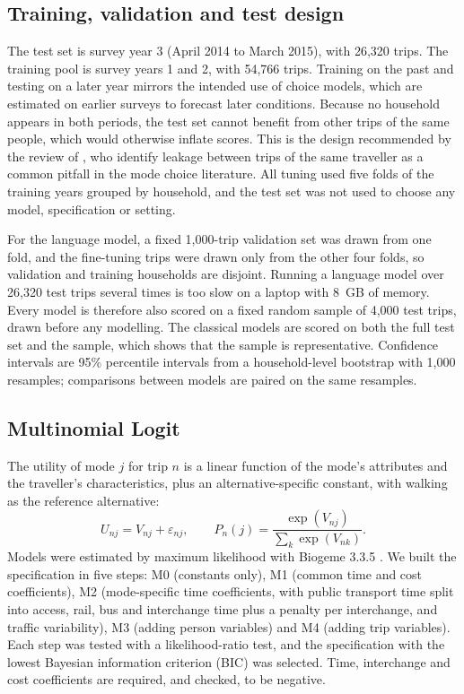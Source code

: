 \documentclass[11pt,a4paper]{article}
\begin{document}
\subsection{Training, validation and test design}
\label{sec:split}
The test set is survey year 3 (April 2014 to March 2015), with 26,320 trips. The training pool is survey years 1 and 2, with 54,766 trips. Training on the past and testing on a later year mirrors the intended use of choice models, which are estimated on earlier surveys to forecast later conditions. Because no household appears in both periods, the test set cannot benefit from other trips of the same people, which would otherwise inflate scores. This is the design recommended by the review of \citet{hillel2021}, who identify leakage between trips of the same traveller as a common pitfall in the mode choice literature. All tuning used five folds of the training years grouped by household, and the test set was not used to choose any model, specification or setting.

For the language model, a fixed 1,000-trip validation set was drawn from one fold, and the fine-tuning trips were drawn only from the other four folds, so validation and training households are disjoint. Running a language model over 26,320 test trips several times is too slow on a laptop with 8~GB of memory. Every model is therefore also scored on a fixed random sample of 4,000 test trips, drawn before any modelling. The classical models are scored on both the full test set and the sample, which shows that the sample is representative. Confidence intervals are 95\% percentile intervals from a household-level bootstrap with 1,000 resamples; comparisons between models are paired on the same resamples.

\subsection{Multinomial Logit}
\label{sec:mnl}
The utility of mode $j$ for trip $n$ is a linear function of the mode's attributes and the traveller's characteristics, plus an alternative-specific constant, with walking as the reference alternative:
\begin{equation}
U_{nj} = V_{nj} + \varepsilon_{nj}, \qquad P_{n}(j) = \frac{\exp(V_{nj})}{\sum_{k}\exp(V_{nk})}.
\end{equation}
Models were estimated by maximum likelihood with Biogeme 3.3.5 \citep{bierlaire2023}. We built the specification in five steps: M0 (constants only), M1 (common time and cost coefficients), M2 (mode-specific time coefficients, with public transport time split into access, rail, bus and interchange time plus a penalty per interchange, and traffic variability), M3 (adding person variables) and M4 (adding trip variables). Each step was tested with a likelihood-ratio test, and the specification with the lowest Bayesian information criterion (BIC) was selected. Time, interchange and cost coefficients are required, and checked, to be negative.
\end{document}
